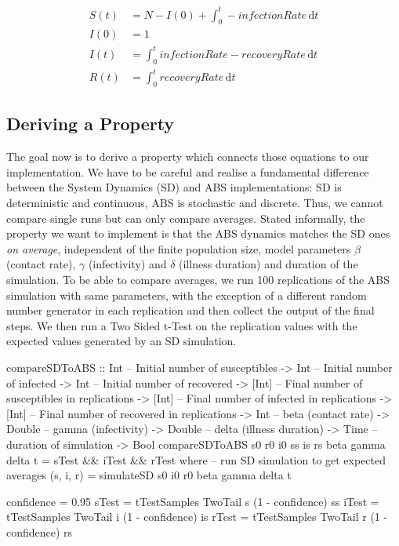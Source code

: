 \begin{align}
S(t) &= N - I(0) + \int_0^t -infectionRate\, \mathrm{d}t \\
I(0) &= 1 \\
I(t) &= \int_0^t infectionRate - recoveryRate\, \mathrm{d}t \\
R(t) &= \int_0^t recoveryRate\, \mathrm{d}t
\end{align}

\subsection{Deriving a Property}
The goal now is to derive a property which connects those equations to our implementation. We have to be careful and realise a fundamental difference between the System Dynamics (SD) and ABS implementations: SD is deterministic and continuous, ABS is stochastic and discrete. Thus, we cannot compare single runs but can only compare averages. Stated informally, the property we want to implement is that the ABS dynamics matches the SD ones \textit{on average}, independent of the finite population size, model parameters $\beta$ (contact rate), $\gamma$ (infectivity) and $\delta$ (illness duration) and duration of the simulation. To be able to compare averages, we run 100 replications of the ABS simulation with same parameters, with the exception of a different random number generator in each replication and then collect the output of the final steps. We then run a Two Sided t-Test on the replication values with the expected values generated by an SD simulation.

\begin{HaskellCode}
compareSDToABS :: Int    -- Initial number of susceptibles
               -> Int    -- Initial number of infected
               -> Int    -- Initial number of recovered
               -> [Int]  -- Final number of susceptibles in replications
               -> [Int]  -- Final number of infected in replications
               -> [Int]  -- Final number of recovered in replications
               -> Int    -- beta (contact rate)
               -> Double -- gamma (infectivity)
               -> Double -- delta (illness duration)
               -> Time   -- duration of simulation
               -> Bool
compareSDToABS s0 r0 i0
               ss is rs
               beta gamma delta t = sTest && iTest && rTest
  where
    -- run SD simulation to get expected averages
    (s, i, r) = simulateSD s0 i0 r0 beta gamma delta t
    
    confidence = 0.95
    sTest = tTestSamples TwoTail s (1 - confidence) ss
    iTest = tTestSamples TwoTail i (1 - confidence) is
    rTest = tTestSamples TwoTail r (1 - confidence) rs
\end{HaskellCode}

